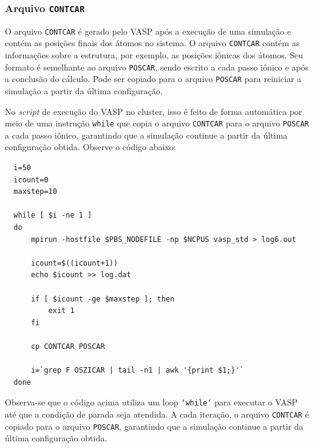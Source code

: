 \subsubsection{Arquivo \texttt{CONTCAR}}
O arquivo \texttt{CONTCAR} é gerado pelo VASP após a execução de uma simulação e contém as posições
finais dos átomos no sistema. O arquivo \texttt{CONTCAR} contém as informações sobre a estrutura,
por exemplo, as posições iônicas dos átomos. Seu formato é semelhante ao arquivo \texttt{POSCAR},
sendo escrito a cada passo iônico e após a conclusão do cálculo. Pode ser copiado para o arquivo
\texttt{POSCAR} para reiniciar a simulação a partir da última configuração.

No \textit{script} de execução do VASP no cluster, isso é feito de forma automática por meio de uma
instrução \texttt{while} que copia o arquivo \texttt{CONTCAR} para o arquivo \texttt{POSCAR} a cada
passo iônico, garantindo que a simulação continue a partir da última configuração obtida. Observe o
código abaixo:

\begin{verbatim}
  i=50
  icount=0
  maxstep=10

  while [ $i -ne 1 ]
  do
      mpirun -hostfile $PBS_NODEFILE -np $NCPUS vasp_std > log6.out

      icount=$((icount+1))
      echo $icount >> log.dat

      if [ $icount -ge $maxstep ]; then
          exit 1
      fi

      cp CONTCAR POSCAR

      i=`grep F OSZICAR | tail -n1 | awk '{print $1;}'`
  done
\end{verbatim}

Observa-se que o código acima utiliza um loop \texttt{`while`} para executar o VASP até que a condição
de parada seja atendida. A cada iteração, o arquivo \texttt{CONTCAR} é copiado para o arquivo
\texttt{POSCAR}, garantindo que a simulação continue a partir da última configuração obtida.

